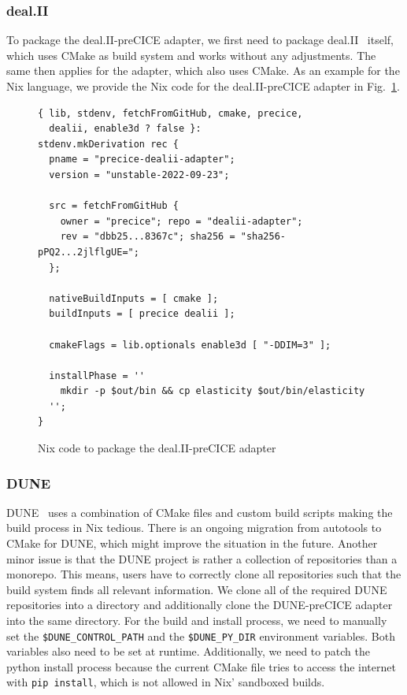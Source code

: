 \documentclass{eceasst}
\begin{document}
\subsubsection{deal.II}


To package the deal.II-preCICE adapter, we first need to package deal.II~\cite{dealII95} itself, which uses CMake as build system and works without any adjustments.
The same then applies for the adapter, which also uses CMake.
As an example for the Nix language, we provide the Nix code for the deal.II-preCICE adapter in Fig.~\ref{lst:dealii-adapter-nix}.

\begin{figure}
    \normalsize
    \begin{verbatim}
{ lib, stdenv, fetchFromGitHub, cmake, precice,
  dealii, enable3d ? false }:
stdenv.mkDerivation rec {
  pname = "precice-dealii-adapter";
  version = "unstable-2022-09-23";

  src = fetchFromGitHub {
    owner = "precice"; repo = "dealii-adapter";
    rev = "dbb25...8367c"; sha256 = "sha256-pPQ2...2jlflgUE=";
  };

  nativeBuildInputs = [ cmake ];
  buildInputs = [ precice dealii ];

  cmakeFlags = lib.optionals enable3d [ "-DDIM=3" ];

  installPhase = ''
    mkdir -p $out/bin && cp elasticity $out/bin/elasticity
  '';
}
    \end{verbatim}
    \caption{Nix code to package the deal.II-preCICE adapter}
    \label{lst:dealii-adapter-nix}
\end{figure}

\subsubsection{DUNE}

DUNE~\cite{bastian2020dune} uses a combination of CMake files and custom build scripts making the build process in Nix tedious.
There is an ongoing migration from autotools to CMake for DUNE, which might improve the situation in the future.
Another minor issue is that the DUNE project is rather a collection of repositories than a monorepo. This means, users have to correctly clone all repositories such that the build system finds all relevant information.
We clone all of the required DUNE repositories into a directory and additionally clone the DUNE-preCICE adapter into the same directory.
For the build and install process, we need to manually set the \texttt{\$DUNE\_CONTROL\_PATH} and the \texttt{\$DUNE\_PY\_DIR} environment variables. Both variables also need to be set at runtime.
Additionally, we need to patch the python install process because the current CMake file tries to access the internet with \texttt{pip install}, which is not allowed in Nix' sandboxed builds.
\end{document}
